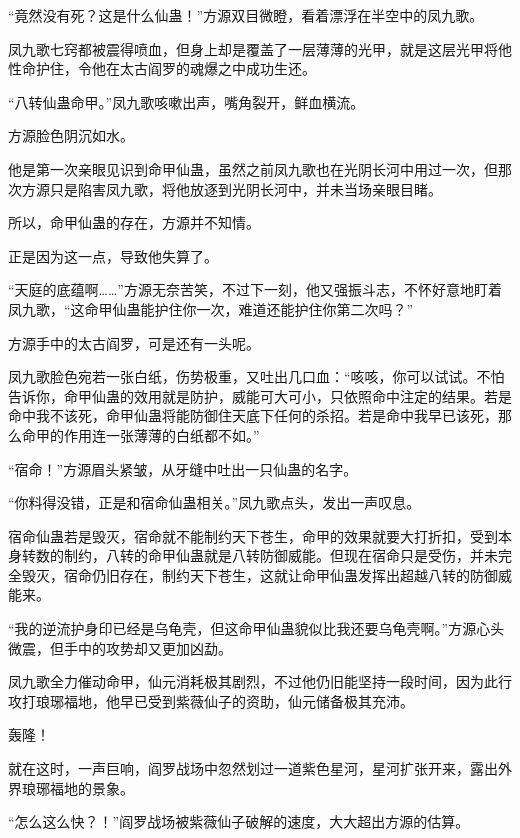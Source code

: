 
\begin{this_body}

“竟然没有死？这是什么仙蛊！”方源双目微瞪，看着漂浮在半空中的凤九歌。

凤九歌七窍都被震得喷血，但身上却是覆盖了一层薄薄的光甲，就是这层光甲将他性命护住，令他在太古阎罗的魂爆之中成功生还。

“八转仙蛊命甲。”凤九歌咳嗽出声，嘴角裂开，鲜血横流。

方源脸色阴沉如水。

他是第一次亲眼见识到命甲仙蛊，虽然之前凤九歌也在光阴长河中用过一次，但那次方源只是陷害凤九歌，将他放逐到光阴长河中，并未当场亲眼目睹。

所以，命甲仙蛊的存在，方源并不知情。

正是因为这一点，导致他失算了。

“天庭的底蕴啊……”方源无奈苦笑，不过下一刻，他又强振斗志，不怀好意地盯着凤九歌，“这命甲仙蛊能护住你一次，难道还能护住你第二次吗？”

方源手中的太古阎罗，可是还有一头呢。

凤九歌脸色宛若一张白纸，伤势极重，又吐出几口血：“咳咳，你可以试试。不怕告诉你，命甲仙蛊的效用就是防护，威能可大可小，只依照命中注定的结果。若是命中我不该死，命甲仙蛊将能防御住天底下任何的杀招。若是命中我早已该死，那么命甲的作用连一张薄薄的白纸都不如。”

“宿命！”方源眉头紧皱，从牙缝中吐出一只仙蛊的名字。

“你料得没错，正是和宿命仙蛊相关。”凤九歌点头，发出一声叹息。

宿命仙蛊若是毁灭，宿命就不能制约天下苍生，命甲的效果就要大打折扣，受到本身转数的制约，八转的命甲仙蛊就是八转防御威能。但现在宿命只是受伤，并未完全毁灭，宿命仍旧存在，制约天下苍生，这就让命甲仙蛊发挥出超越八转的防御威能来。

“我的逆流护身印已经是乌龟壳，但这命甲仙蛊貌似比我还要乌龟壳啊。”方源心头微震，但手中的攻势却又更加凶勐。

凤九歌全力催动命甲，仙元消耗极其剧烈，不过他仍旧能坚持一段时间，因为此行攻打琅琊福地，他早已受到紫薇仙子的资助，仙元储备极其充沛。

轰隆！

就在这时，一声巨响，阎罗战场中忽然划过一道紫色星河，星河扩张开来，露出外界琅琊福地的景象。

“怎么这么快？！”阎罗战场被紫薇仙子破解的速度，大大超出方源的估算。


\end{this_body}
